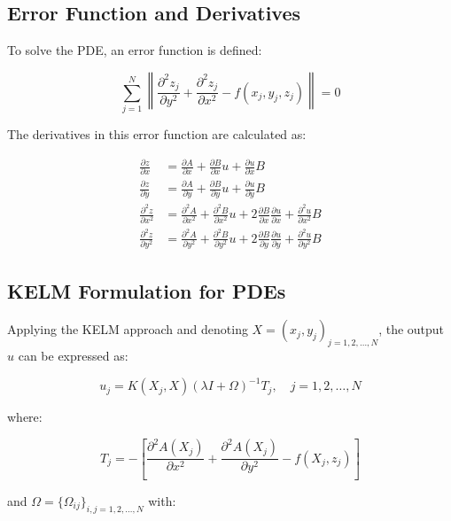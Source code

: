 \documentclass[11pt,a4paper]{article}
\begin{document}
\subsection{Error Function and Derivatives}
To solve the PDE, an error function is defined:

\begin{equation}
\sum_{j=1}^{N} \left\|\frac{\partial^2 z_j}{\partial y^2} + \frac{\partial^2 z_j}{\partial x^2} - f(x_j, y_j, z_j)\right\| = 0
\end{equation}

The derivatives in this error function are calculated as:

\begin{align}
\frac{\partial z}{\partial x} &= \frac{\partial A}{\partial x} + \frac{\partial B}{\partial x}u + \frac{\partial u}{\partial x}B \\
\frac{\partial z}{\partial y} &= \frac{\partial A}{\partial y} + \frac{\partial B}{\partial y}u + \frac{\partial u}{\partial y}B \\
\frac{\partial^2 z}{\partial x^2} &= \frac{\partial^2 A}{\partial x^2} + \frac{\partial^2 B}{\partial x^2}u + 2\frac{\partial B}{\partial x}\frac{\partial u}{\partial x} + \frac{\partial^2 u}{\partial x^2}B \\
\frac{\partial^2 z}{\partial y^2} &= \frac{\partial^2 A}{\partial y^2} + \frac{\partial^2 B}{\partial y^2}u + 2\frac{\partial B}{\partial y}\frac{\partial u}{\partial y} + \frac{\partial^2 u}{\partial y^2}B
\end{align}

\subsection{KELM Formulation for PDEs}
Applying the KELM approach and denoting $X = (x_j, y_j)_{j=1,2,\ldots,N}$, the output $u$ can be expressed as:

\begin{equation}
u_j = K(X_j, X)(\lambda I + \Omega)^{-1}T_j, \quad j=1,2,\ldots,N
\end{equation}

where:

\begin{equation}
T_j = -\left[\frac{\partial^2 A(X_j)}{\partial x^2} + \frac{\partial^2 A(X_j)}{\partial y^2} - f(X_j, z_j)\right]
\end{equation}

and $\Omega = \{\Omega_{ij}\}_{i,j=1,2,\ldots,N}$ with:
\end{document}
